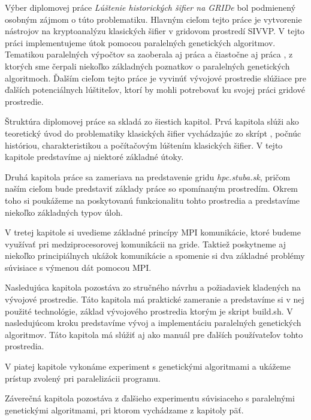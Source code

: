 
Výber diplomovej práce \textit{Lúštenie historických šifier na GRIDe} bol podmienený osobným zájmom o túto problematiku.
Hlavným cieľom tejto práce je vytvorenie nástrojov na kryptoanalýzu klasických šifier v gridovom prostredí SIVVP.
V tejto práci implementujeme útok pomocou paralelných genetických algoritmov.
Tematikou paralelných výpočtov sa zaoberala aj práca \cite{pea} a čiastočne aj práca \cite{ev}, z ktorých sme čerpali niekoľko základných poznatkov o paralelných genetických algoritmoch.
Ďalším cieľom tejto práce je vyvinúť vývojové prostredie slúžiace pre ďalších potenciálnych lúštiteľov, ktorí by mohli potrebovať ku svojej práci gridové prostredie.

Štruktúra diplomovej práce sa skladá zo šiestich kapitol.
Prvá kapitola slúži ako teoretický úvod do problematiky klasických šifier vychádzajúc zo skrípt \cite{ks}, počnúc históriou, charakteristikou a počítačovým lúštením klasických šifier. V tejto kapitole predstavíme aj niektoré základné útoky.

Druhá kapitola práce sa zameriava na predstavenie gridu \textit{hpc.stuba.sk}, pričom naším cieľom bude predstaviť základy práce so spomínaným prostredím.
Okrem toho si poukážeme na poskytovanú funkcionalitu tohto prostredia a predstavíme niekoľko základných typov úloh.

V tretej kapitole si uvedieme základné princípy MPI komunikácie, ktoré budeme využívať pri medziprocesorovej komunikácii na gride.
Taktiež poskytneme aj niekoľko principiálnych ukážok komunikácie a spomenie si dva základné problémy súvisiace s výmenou dát pomocou MPI.

Nasledujúca kapitola pozostáva zo stručného návrhu a požiadaviek kladených na vývojové prostredie.
Táto kapitola má praktické zameranie a predstavíme si v nej použité technológie, základ vývojového prostredia ktorým je skript build.sh.
V nasledujúcom kroku predstavíme vývoj a implementáciu paralelných genetických algoritmov. Táto kapitola má slúžiť aj ako manuál
pre ďalších používateľov tohto prostredia.

V piatej kapitole vykonáme experiment s genetickými algoritmami a ukážeme prístup zvolený pri paralelizácii programu.

Záverečná kapitola pozostáva z ďalšieho experimentu súvisiaceho s paralelnými genetickými algoritmami, pri ktorom vychádzame z kapitoly päť.

